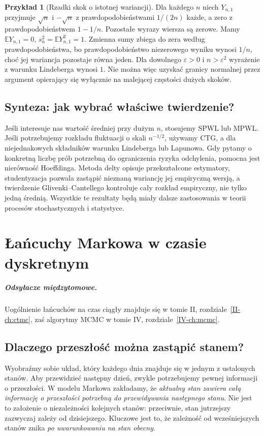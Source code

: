 \documentclass[11pt,a4paper,oneside]{report}
\numberwithin{equation}{chapter}
\theoremstyle{plain}
\theoremstyle{definition}
\newtheorem{przyklad}{Przykład}[chapter]
\theoremstyle{remark}
\newcommand{\E}{\mathbb{E}}
\begin{document}
\begin{przyklad}[Rzadki skok o istotnej wariancji]
Dla każdego $n$ niech $Y_{n,1}$ przyjmuje $\sqrt n$
i $-\sqrt n$ z prawdopodobieństwami $1/(2n)$
każde, a zero z prawdopodobieństwem $1-1/n$.
Pozostałe wyrazy wiersza są zerowe. Mamy
$\E Y_{n,1}=0$, $s_n^2=\E Y_{n,1}^2=1$.
Zmienna sumy zbiega do zera według prawdopodobieństwa,
bo prawdopodobieństwo niezerowego wyniku wynosi $1/n$,
choć jej wariancja pozostaje równa jeden.
Dla dowolnego $\varepsilon>0$ i $n>\varepsilon^2$
wyrażenie z warunku Lindeberga wynosi $1$.
Nie można więc uzyskać granicy normalnej przez
argument opierający się wyłącznie na malejącej
częstości dużych skoków.
\end{przyklad}

\section{Synteza: jak wybrać właściwe twierdzenie?}

Jeśli interesuje nas wartość średniej przy dużym $n$,
stosujemy SPWL lub MPWL. Jeśli potrzebujemy rozkładu
fluktuacji o skali $n^{-1/2}$, używamy CTG, a dla
niejednakowych składników warunku Lindeberga lub
Lapunowa. Gdy pytamy o konkretną liczbę prób potrzebną
do ograniczenia ryzyka odchylenia, pomocna jest
nierówność Hoeffdinga. Metoda delty opisuje
przekształcone estymatory, studentyzacja pozwala
zastąpić nieznaną wariancję jej empiryczną wersją,
a twierdzenie Glivenki--Cantellego kontroluje
cały rozkład empiryczny, nie tylko jedną średnią.
Wszystkie te rezultaty będą miały dalsze zastosowania
w teorii procesów stochastycznych i statystyce.

\chapter{Łańcuchy Markowa w czasie dyskretnym}
\label{ch:markov}
\paragraph{Odsyłacze międzytomowe.} Uogólnienie łańcuchów na czas ciągły znajduje się w tomie II, rozdziale~\ref{II-ch:ctmc}, zaś algorytmy MCMC w tomie IV, rozdziale~\ref{IV-ch:mcmc}.


\section{Dlaczego przeszłość można zastąpić stanem?}

Wyobraźmy sobie układ, który każdego dnia znajduje się w jednym
z ustalonych stanów. Aby przewidzieć następny dzień, zwykle
potrzebujemy pewnej informacji o przeszłości. W modelu Markowa
zakładamy, że \emph{aktualny stan zawiera całą informację o
przeszłości potrzebną do przewidywania następnego stanu}.
Nie jest to założenie o niezależności kolejnych stanów: przeciwnie,
stan jutrzejszy zazwyczaj zależy od dzisiejszego. Kluczowe jest
to, że zależność od wcześniejszych stanów znika \emph{po
uwarunkowaniu na stan obecny}.
\end{document}
